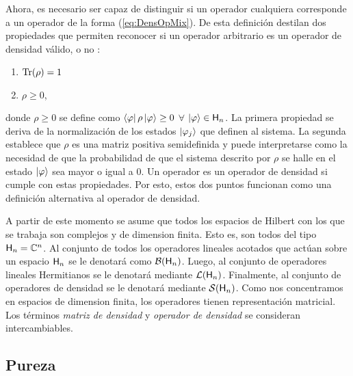 \fi

Ahora, es necesario ser capaz de distinguir si un operador cualquiera corresponde a un operador de la forma (\ref{eq:DensOpMix}). De esta definición destilan dos propiedades que permiten reconocer si un operador arbitrario es un operador de densidad válido, o no \cite{Holevo}:
\begin{enumerate}
    \item $\Tr(\rho)=1$
    \item $\rho\geq 0$,
\end{enumerate}
donde $\rho\geq 0$ se define como $\bra{\varphi}\rho\ket{\varphi}\geq 0$ $\forall$ $\ket{\varphi}\in{\sf H}_{n}$.
La primera propiedad se deriva de la normalización de los estados $\ket{\varphi_{j}}$ que definen al sistema. La segunda establece que $\rho$ es una matriz positiva semidefinida y puede interpretarse como la necesidad de que la probabilidad de que el sistema descrito por $\rho$ se halle en el estado $\ket{\varphi}$ sea mayor o igual a $0$. Un operador es un operador de densidad si cumple con estas propiedades. Por esto, estos dos puntos funcionan como una definición alternativa al operador de densidad.


A partir de este momento se asume que todos los espacios de Hilbert con los que se trabaja son complejos y de dimension finita. Esto es, son todos del tipo ${\sf H}_{n}=\mathbb{C}^{n}$. Al conjunto de todos los operadores lineales acotados que actúan sobre un espacio ${\sf H}_{n}$ se le denotará como $\mathcal{B}({\sf H}_{n})$. Luego, al conjunto de operadores lineales Hermitianos se le denotará mediante $\mathcal{L}({\sf H}_{n})$. Finalmente, al conjunto de operadores de densidad se le denotará mediante $\mathcal{S}({\sf H}_{n})$. Como nos concentramos en espacios de dimension finita, los operadores tienen representación matricial. Los términos \textit{matriz de densidad} y \textit{operador de densidad} se consideran intercambiables.



\subsection{Pureza}

